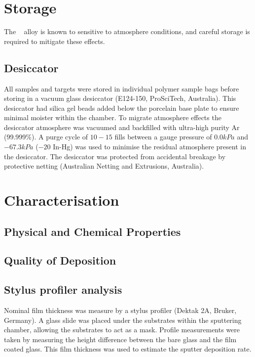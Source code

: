 \documentclass[a4paper,12pt,oneside]{report}%
\begin{document}
\section{Storage}
The \MgZnCa~ alloy is known to sensitive to atmosphere conditions, and careful storage is required to mitigate these effects. 

\subsection{Desiccator}
All samples and targets were stored in individual polymer sample bags before storing in a vacuum glass desiccator (E124-150, ProSciTech, Australia). This desiccator had silica gel beads added below the porcelain base plate to ensure minimal moister within the chamber. To migrate atmosphere effects the desiccator atmosphere was vacuumed and backfilled with ultra-high purity Ar (99.999\%). A purge cycle of $10 - 15$ fills between a gauge pressure of $0.0 kPa$ and $-67.3 kPa$ ($-20$ In-Hg) was used to minimise the residual atmosphere present in the desiccator. The desiccator was protected from accidental breakage by protective netting (Australian Netting and Extrusions, Australia).

\section{Characterisation}

\subsection{Physical and Chemical Properties}

\subsection{Quality of Deposition} 
 
\subsection{Stylus profiler analysis}
Nominal film thickness was measure by a stylus profiler (Dektak 2A, Bruker, Germany). A glass slide was placed under the substrates within the sputtering chamber, allowing the substrates to act as a mask. Profile measurements were taken by measuring the height difference between the bare glass and the film coated glass. This film thickness was used to estimate the sputter deposition rate.  
\end{document}
